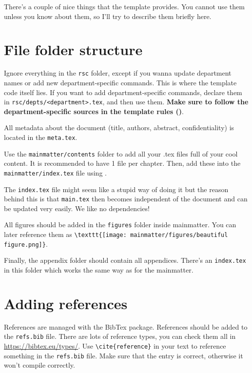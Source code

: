 There's a couple of nice things that the template provides. You cannot use them unless you know about them, so I'll try to describe them briefly here.

\section*{File folder structure}
Ignore everything in the \verb|rsc| folder, except if you wanna update department names or add new department-specific commands. This is where the template code itself lies. If you want to add department-specific commands, declare them in \verb|rsc/depts/<department>.tex|, and then use them. \textbf{Make sure to follow the department-specific sources in the template rules ()}.

All metadata about the document (title, authors, abstract, confidentiality) is located in the \verb|meta.tex|.

Use the \verb|mainmatter/contents| folder to add all your .tex files full of your cool content. It is recommended to have 1 file per chapter. Then, add these into the \verb|mainmatter/index.tex| file using \verb||.

The \verb|index.tex| file might seem like a stupid way of doing it but the reason behind this is that \verb|main.tex| then becomes independent of the document and can be updated very easily. We like no dependencies!

All figures should be added in the \verb|figures| folder inside mainmatter. You can later reference them as \verb|\texttt{[image: mainmatter/figures/beautiful figure.png]}|. 

Finally, the appendix folder should contain all appendices. There's an \verb|index.tex| in this folder which works the same way as for the mainmatter.


\section*{Adding references}

References are managed with the BibTex package. References should be added to the \verb|refs.bib| file. There are lots of reference types, you can check them all in \url{https://bibtex.eu/types/}. Use \verb|\cite{reference}| in your text to reference something in the \verb|refs.bib| file. Make sure that the entry is correct, otherwise it won't compile correctly. 

